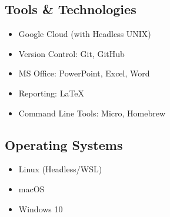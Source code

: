 \documentclass[a4paper,10pt]{article}
\begin{document}
\subsection*{Tools \& Technologies}
\begin{itemize}[label={\faTools}]
    \item Google Cloud (with Headless UNIX)
    \item Version Control: Git, GitHub
    \item MS Office: PowerPoint, Excel, Word
    \item Reporting: LaTeX
    \item Command Line Tools: Micro, Homebrew
\end{itemize}

\subsection*{Operating Systems}
\begin{itemize}[label={\faLaptop}]
    \item Linux (Headless/WSL)
    \item macOS
    \item Windows 10
\end{itemize}

\end{document}
